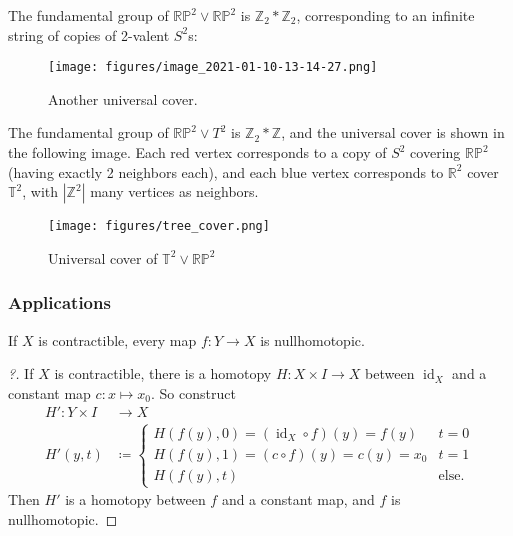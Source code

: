 \begin{example}

The fundamental group of \({\mathbb{RP}}^2 \vee {\mathbb{RP}}^2\) is
\({\mathbb{Z}}_2 \ast {\mathbb{Z}}_2\), corresponding to an infinite
string of copies of 2-valent \(S^2\)s:

\begin{figure}
\centering
\texttt{[image: figures/image\_2021-01-10-13-14-27.png]}
\caption{Another universal cover.}
\end{figure}

\end{example}

\begin{example}

The fundamental group of \({\mathbb{RP}}^2 \vee T^2\) is
\({\mathbb{Z}}_2 \ast {\mathbb{Z}}\), and the universal cover is shown
in the following image. Each red vertex corresponds to a copy of \(S^2\)
covering \({\mathbb{RP}}^2\) (having exactly 2 neighbors each), and each
blue vertex corresponds to \({\mathbb{R}}^2\) cover \({\mathbb{T}}^2\),
with \({\left\lvert {{\mathbb{Z}}^2} \right\rvert}\) many vertices as
neighbors.

\begin{figure}
\centering
\texttt{[image: figures/tree\_cover.png]}
\caption{Universal cover of \({\mathbb{T}}^2 \vee {\mathbb{RP}}^2\)}
\end{figure}

\end{example}

\hypertarget{applications}{%
\subsubsection{Applications}\label{applications}}

\begin{theorem}

If \(X\) is contractible, every map \(f: Y \to X\) is nullhomotopic.

\end{theorem}

\begin{proof}[?]

If \(X\) is contractible, there is a homotopy \(H: X\times I \to X\)
between \(\operatorname{id}_X\) and a constant map \(c: x \mapsto x_0\).
So construct
\begin{align*}
H': Y\times I &\to X \\
H'(y, t) 
&\coloneqq
\begin{cases}
H(f(y), 0) = (\operatorname{id}_X \circ f)(y) = f(y) & t=0 \\
H(f(y), 1) = (c \circ f)(y) = c(y) = x_0 & t=1 \\
H(f(y), t) & \text{else}.
\end{cases}
\end{align*}
Then \(H'\) is a homotopy between \(f\) and a constant map, and \(f\) is
nullhomotopic.

\end{proof}

